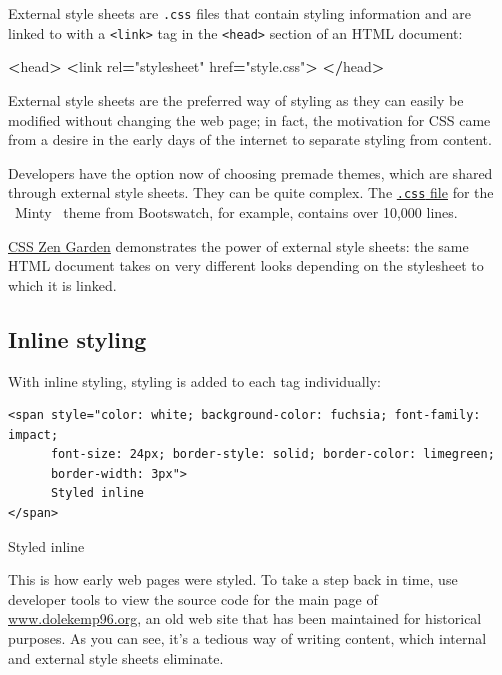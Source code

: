 \documentclass[
  openany]{book}
\newenvironment{Shaded}{\begin{snugshade}}{\end{snugshade}}
\newcommand{\NormalTok}[1]{#1}
\newcommand{\OperatorTok}[1]{\textcolor[rgb]{0.81,0.36,0.00}{\textbf{#1}}}
\newcommand{\StringTok}[1]{\textcolor[rgb]{0.31,0.60,0.02}{#1}}
\begin{document}
External style sheets are \texttt{.css} files that contain styling information and are linked to with a \texttt{\textless{}link\textgreater{}} tag in the \texttt{\textless{}head\textgreater{}} section of an HTML document:

\begin{Shaded}
\begin{Highlighting}[]
\OperatorTok{\textless{}}\NormalTok{head}\OperatorTok{\textgreater{}}
    \OperatorTok{\textless{}}\NormalTok{link rel}\OperatorTok{=}\StringTok{"stylesheet"}\NormalTok{ href}\OperatorTok{=}\StringTok{"style.css"}\OperatorTok{\textgreater{}}
\OperatorTok{\textless{}/}\NormalTok{head}\OperatorTok{\textgreater{}}
\end{Highlighting}
\end{Shaded}

External style sheets are the preferred way of styling as they can easily be modified without changing the web page; in fact, the motivation for CSS came from a desire in the early days of the internet to separate styling from content.

Developers have the option now of choosing premade themes, which are shared through external style sheets. They can be quite complex. The \href{https://github.com/thomaspark/bootswatch/blob/master/docs/4/minty/bootstrap.css}{\texttt{.css} file} for the ~Minty~ theme from Bootswatch, for example, contains over 10,000 lines.

\href{http://www.csszengarden.com/}{CSS Zen Garden} demonstrates the power of external style sheets: the same HTML document takes on very different looks depending on the stylesheet to which it is linked.

\hypertarget{inline-styling}{%
\subsection{Inline styling}\label{inline-styling}}

With inline styling, styling is added to each tag individually:

\begin{verbatim}
<span style="color: white; background-color: fuchsia; font-family: impact; 
      font-size: 24px; border-style: solid; border-color: limegreen; 
      border-width: 3px">
      Styled inline
</span>
\end{verbatim}

{Styled inline}

This is how early web pages were styled. To take a step back in time, use developer tools to view the source code for the main page of \href{http://www.dolekemp96.org/main.htm}{www.dolekemp96.org}, an old web site that has been maintained for historical purposes. As you can see, it's a tedious way of writing content, which internal and external style sheets eliminate.
\end{document}
